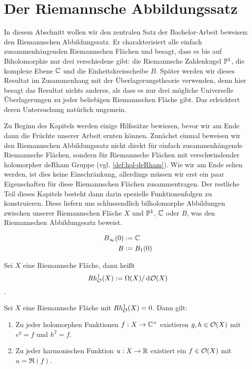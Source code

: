 \section{Der Riemannsche Abbildungssatz}
\label{sec:RMT}

In diesem Abschnitt wollen wir den zentralen Satz der Bachelor-Arbeit
beweisen: den Riemannschen Abbildungssatz. Er charakterisiert alle
einfach zusammenhängenden Riemannschen Flächen und besagt,
dass es bis auf Biholomorphie nur drei verschiedene gibt: die
Riemannsche Zahlenkugel $\P^1$, die komplexe Ebene $\C$
und die Einheitskreisscheibe $B$.
Später werden wir dieses Resultat im Zusammenhang mit der
Überlagerungstheorie verwenden, denn hier besagt das Resultat nichts
anderes, als dass es nur drei mögliche Universelle Überlagerungen zu
jeder beliebigen Riemannschen Fläche gibt. Das erleichtert deren
Untersuchung natürlich ungemein.

Zu Beginn des Kapitels werden einige Hilfssätze bewiesen, bevor wir am
Ende dann die Früchte unserer Arbeit ernten können. Zunächst einmal
beweisen wir den Riemannschen Abbildungssatz nicht
direkt für einfach zusammenhängende Riemannsche Flächen, sondern für
Riemannsche Flächen mit verschwindender holomorpher deRham Gruppe
(vgl. \ref{def:hol-deRham}). Wie wir am Ende sehen werden, ist dies
keine Einschränkung, allerdings müssen wir erst ein paar Eigenschaften
für diese Riemannschen Flächen zusammentragen. Der restliche Teil
dieses Kapitels besteht dann darin spezielle Funktionenfolgen
zu konstruieren. Diese liefern uns schlussendlich bilholomorphe
Abbildungen zwischen unserer Riemannschen Fläche $X$ und $\P^1$, $\C$
oder $B$, was den Riemannschen Abbildungssatz beweist.


\begin{defin}
  \begin{align*}
    B_\infty(0) & := \C \\
    B & := B_1(0)
  \end{align*}
\end{defin}



\begin{defin}
  \label{def:hol-deRham}
  Sei $X$ eine Riemannsche Fläche, dann heißt
  \[
  Rh_\hol^1(X) := \Omega(X)/\d[\hol(X)]
  \]
  .
\end{defin}

\begin{lemma}
  \label{lemma:ex-log}
  Sei $X$ eine Riemannsche Fläche mit $Rh^1_\hol(X) = 0$. Dann gilt:
  \begin{enumerate}
  \item Zu jeder holomorphen Funktionen $f: X \ra \C^\times$ existieren
    $g, h \in \hol(X)$ mit $e^g = f$ und $h^2 = f$.
  \item Zu jeder harmonischen Funktion $u: X \ra \R$ existiert ein $f
    \in \hol(X)$ mit $u = \Re(f)$.
  \end{enumerate}
\end{lemma}

